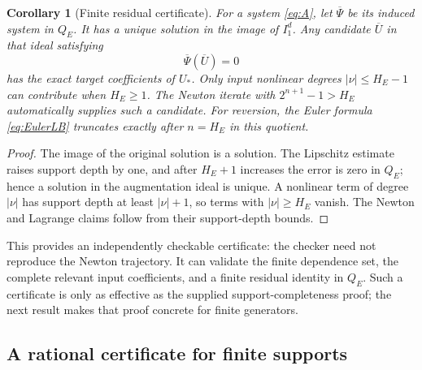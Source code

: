 \documentclass[11pt,a4paper]{article}
\newtheorem{corollary}[theorem]{Corollary}
\theoremstyle{definition}
\theoremstyle{remark}
\begin{document}
\begin{corollary}[Finite residual certificate]\label{cor:residual}
For a system \eqref{eq:A}, let $\overline\Psi$ be its induced system in
$Q_E$. It has a unique solution in the image of $I_1^d$.
Any candidate $\overline U$ in that ideal satisfying
\[
 \overline\Psi(\overline U)=0
\]
has the exact target coefficients of $U_*$. Only input nonlinear degrees
$|\nu|\le H_E-1$ can contribute when $H_E\ge1$.
The Newton iterate with $2^{n+1}-1>H_E$ automatically supplies such a
candidate. For reversion, the Euler formula \eqref{eq:EulerLB} truncates
exactly after $n=H_E$ in this quotient.
\end{corollary}
\begin{proof}
The image of the original solution is a solution. The Lipschitz estimate
raises support depth by one, and after $H_E+1$ increases the error is
zero in $Q_E$; hence a solution in the augmentation ideal is unique.
A nonlinear term of degree $|\nu|$ has support depth at least
$|\nu|+1$, so terms with $|\nu|\ge H_E$ vanish. The Newton and Lagrange
claims follow from their support-depth bounds.
\end{proof}

This provides an independently checkable certificate: the checker need not
reproduce the Newton trajectory. It can validate the finite dependence
set, the complete relevant input coefficients, and a finite residual
identity in $Q_E$. Such a certificate is only as effective as the supplied
support-completeness proof; the next result makes that proof concrete for
finite generators.

\subsection{A rational certificate for finite supports}
\end{document}
